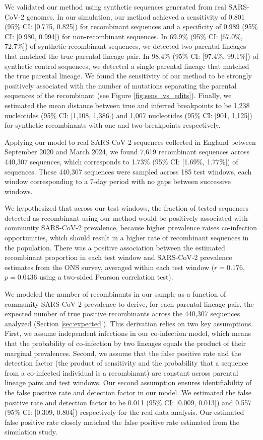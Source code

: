 \documentclass[11pt,oneside,letterpaper]{article}
\begin{document}
We validated our method using synthetic sequences generated from real SARS-CoV-2 genomes. In our simulation, our method achieved a sensitivity of 0.801 (95\% CI: [0.775, 0.825]) for recombinant sequences and a specificity of 0.989 (95\% CI: [0.980, 0.994]) for non-recombinant sequences. In 69.9\% (95\% CI: [67.0\%, 72.7\%]) of synthetic recombinant sequences, we detected two parental lineages that matched the true parental lineage pair. In 98.4\% (95\% CI: [97.4\%, 99.1\%]) of synthetic control sequences, we detected a single parental lineage that matched the true parental lineage. We found the sensitivity of our method to be strongly positively associated with the number of mutations separating the parental sequences of the recombinant (see Figure \ref{fig:sens_vs_edits}). Finally, we estimated the mean distance between true and inferred breakpoints to be 1,238 nucleotides (95\% CI: [1,108, 1,386]) and 1,007 nucleotides (95\% CI: [901, 1,125]) for synthetic recombinants with one and two breakpoints respectively.

Applying our model to real SARS-CoV-2 sequences collected in England between September 2020 and March 2024, we found 7,619 recombinant sequences across 440,307 sequences, which corresponds to 1.73\% (95\% CI: [1.69\%, 1.77\%]) of sequences. These 440,307 sequences were sampled across 185 test windows, each window corresponding to a 7-day period with no gaps between successive windows. 

We hypothesized that across our test windows, the fraction of tested sequences detected as recombinant using our method would be positively associated with community SARS-CoV-2 prevalence, because higher prevalence raises co-infection opportunities, which should result in a higher rate of recombinant sequences in the population. There was a positive association between the estimated recombinant proportion in each test window and SARS-CoV-2 prevalence estimates from the ONS survey, averaged within each test window ($r = 0.176$, $p = 0.0436$ using a two-sided Pearson correlation test). 

We modeled the number of recombinants in our sample as a function of community SARS-CoV-2 prevalence to derive, for each parental lineage pair, the expected number of true positive recombinants across the 440,307 sequences analyzed (Section \ref{sec:expected}). This derivation relies on two key assumptions. First, we assume independent infections in our co-infection model, which means that the probability of co-infection by two lineages equals the product of their marginal prevalences. Second, we assume that the false positive rate and the detection factor (the product of sensitivity and the probability that a sequence from a co-infected individual is a recombinant) are constant across parental lineage pairs and test windows. Our second assumption ensures identifiability of the false positive rate and detection factor in our model. We estimated the false positive rate and detection factor to be 0.011 (95\% CI: [0.009, 0.013]) and 0.557 (95\% CI: [0.309, 0.804]) respectively for the real data analysis. Our estimated false positive rate closely matched the false positive rate estimated from the simulation study. 
\end{document}
